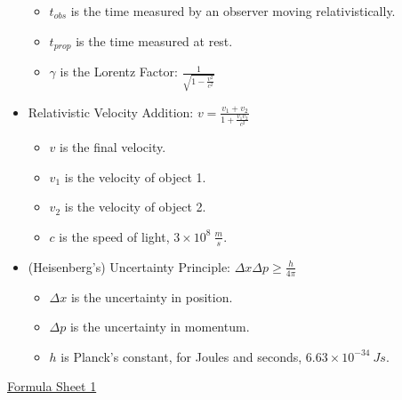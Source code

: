 \documentclass[letterpaper,14pt]{extarticle}
\begin{document}
\begin{itemize}
    \begin{itemize}
        \item $t_{obs}$ is the time measured by an observer moving relativistically.
        \item $t_{prop}$ is the time measured at rest.
        \item $\gamma$ is the Lorentz Factor: $\frac{1}{\sqrt{1 - \frac{v^2}{c^2}}}$
    \end{itemize}
    \item Relativistic Velocity Addition: $v = \frac{v_1 + v_2}{1 + \frac{v_1v_2}{c^2}}$
    \begin{itemize}
        \item $v$ is the final velocity.
        \item $v_1$ is the velocity of object 1.
        \item $v_2$ is the velocity of object 2.
        \item $c$ is the speed of light, $3 \times 10^8\ \frac{m}{s}$.
    \end{itemize}
    \item (Heisenberg's) Uncertainty Principle: $\Delta x \Delta p \geq \frac{h}{4\pi}$
    \begin{itemize}
        \item $\Delta x$ is the uncertainty in position.
        \item $\Delta p$ is the uncertainty in momentum.
        \item $h$ is Planck's constant, for Joules and seconds, $6.63 \times 10^{-34}\ Js$.
    \end{itemize}
\end{itemize}
\pagebreak
\underline{Formula Sheet 1}
\end{document}
